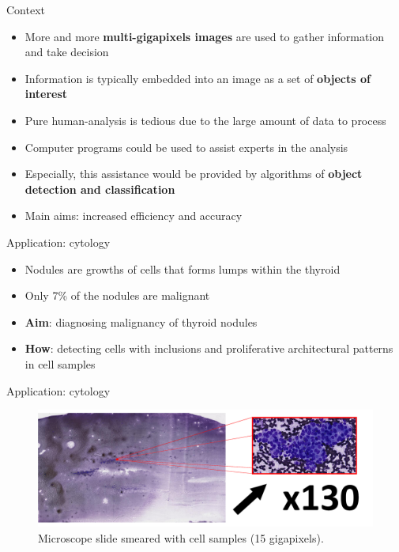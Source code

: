 \documentclass{beamer}
\begin{document}
\begin{frame}{Context}
	\begin{itemize}
		\item More and more \textbf{multi-gigapixels images} are used to gather information and take decision
		\item Information is typically embedded into an image as a set of \textbf{objects of interest}
		\item Pure human-analysis is tedious due to the large amount of data to process
		\item Computer programs could be used to assist experts in the analysis
		\item Especially, this assistance would be provided by algorithms of \textbf{object detection and classification} 
		\item Main aims: increased efficiency and accuracy
	\end{itemize}
\end{frame}


\begin{frame}{Application: cytology}
	\begin{itemize}
		\item Nodules are growths of cells that forms lumps within the thyroid 
		\item Only 7\% of the nodules are malignant
		\item \textbf{Aim}: diagnosing malignancy of thyroid nodules
		\item \textbf{How}: detecting cells with inclusions and proliferative architectural patterns in cell samples
	\end{itemize}

\end{frame}


\begin{frame}{Application: cytology}
	\vfill
	\begin{figure}[h]
	\center
	\includegraphics[scale=0.17]{images/whole-slide-dim.png}
	\caption{Microscope slide smeared with cell samples (15 gigapixels).}
	\end{figure}
	\vfill
\end{frame}
\end{document}
